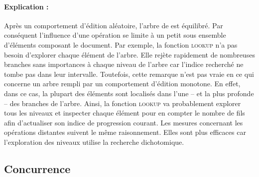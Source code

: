 \paragraph{Explication :} Après un comportement d'édition aléatoire, l'arbre de
\LSEQ est équilibré. Par conséquent l'influence d'une opération se limite à un
petit sous ensemble d'éléments composant le document. Par exemple, la fonction
\textsc{lookup} n'a pas besoin d'explorer chaque élément de l'arbre. Elle rejète
rapidement de nombreuses branches sans importances à chaque niveau de l'arbre
car l'indice recherché ne tombe pas dans leur intervalle. Toutefois, cette
remarque n'est pas vraie en ce qui concerne un arbre rempli par un comportement
d'édition monotone. En effet, dans ce cas, la plupart des éléments sont
localisés dans l'une -- et la plus profonde -- des branches de l'arbre. Ainsi,
la fonction \textsc{lookup} va probablement explorer tous les niveaux et
inspecter chaque élément pour en compter le nombre de fils afin d'actualiser son
indice de progression courant. Les mesures concernant les opérations distantes
suivent le même raisonnement. Elles sont plus efficaces car l'exploration des
niveaux utilise la recherche dichotomique.


\subsection{Concurrence}

